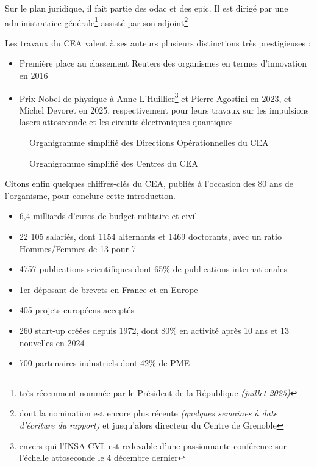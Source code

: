     Sur le plan juridique, il fait partie des \gls{odac} et des \gls{epic}.
    Il est dirigé par une administratrice générale\footnote{très récemment nommée par le Président de la République \textit{(juillet 2025)}} assisté par son adjoint\footnote{dont la nomination est encore plus récente \textit{(quelques semaines à date d'écriture du rapport)} et jusqu'alors directeur du Centre de Grenoble}

    Les travaux du \gls{CEA} valent à ses auteurs plusieurs distinctions très prestigieuses :
    \begin{itemize}
        \item Première place au classement Reuters des organismes en termes d'innovation en 2016
        \item Prix Nobel de physique à Anne L'Huillier\footnote{envers qui l'INSA CVL est redevable d'une passionnante conférence sur l'échelle attoseconde le 4 décembre dernier} et Pierre Agostini en 2023, et Michel Devoret en 2025, respectivement pour leurs travaux sur les impulsions lasers attoseconde et les circuits électroniques quantiques
    \end{itemize}

    \begin{figure}[H]
        \centering
        \fbox{}
        \caption{Organigramme simplifié des Directions Opérationnelles du CEA}
        \label{fig:organigramme-CEA}
    \end{figure}

    \begin{figure}[H]
        \centering
        \fbox{}
        \caption{Organigramme simplifié des Centres du CEA}
        \label{fig:organigramme-Centres}
    \end{figure}

Citons enfin quelques chiffres-clés du \gls{CEA}\cite{CEA_prez_generale}, publiés à l'occasion des 80 ans de l'organisme, pour conclure cette introduction.
    \begin{itemize}
        \item 6,4 milliards d'euros de budget militaire et civil
        \item 22 105 salariés, dont 1154 alternants et 1469 doctorants, avec un ratio Hommes/Femmes de 13 pour 7
        \item 4757 publications scientifiques dont 65\% de publications internationales
        \item 1er déposant de brevets en France et en Europe
        \item 405 projets européens acceptés
        \item 260 start-up créées depuis 1972, dont 80\% en activité après 10 ans et 13 nouvelles en 2024
        \item 700 partenaires industriels dont 42\% de PME
    \end{itemize}

